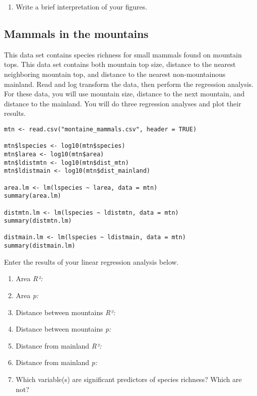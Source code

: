 \documentclass[11pt]{article}
\begin{document}
\smallskip

\begin{enumerate}[resume]
	\item Write a brief interpretation of your figures.
\end{enumerate}

\vspace{4\baselineskip}

\subsection*{Mammals in the mountains}

This data set contains species richness for small mammals found on mountain tops. This data set contains both mountain top size, distance to the nearest neighboring mountain top, and distance to the nearest non-mountainous mainland.  Read and log transform the data, then perform the regression analysis.  For these data, you will use mountain size, distance to the next mountain, and distance to the mainland.  You will do three regression analyses and plot their results.


\begin{verbatim}
mtn <- read.csv("montaine_mammals.csv", header = TRUE)

mtn$lspecies <- log10(mtn$species)
mtn$larea <- log10(mtn$area)
mtn$ldistmtn <- log10(mtn$dist_mtn)
mtn$ldistmain <- log10(mtn$dist_mainland)

area.lm <- lm(lspecies ~ larea, data = mtn)
summary(area.lm)

distmtn.lm <- lm(lspecies ~ ldistmtn, data = mtn)
summary(distmtn.lm)

distmain.lm <- lm(lspecies ~ ldistmain, data = mtn)
summary(distmain.lm)
\end{verbatim}

Enter the results of your linear regression analysis below.

\begin{enumerate}[resume]
	\item  Area \textit{R²:} 
	
	\item Area \textit{p:}
	
	\item  Distance between mountains \textit{R²:} 
	
	\item Distance between mountains \textit{p:}
	
	\item  Distance from mainland \textit{R²:} 
	
	\item Distance from mainland \textit{p:}
	
	\item Which variable(s) are significant predictors of species richness? Which are not?
\end{enumerate}
\end{document}
